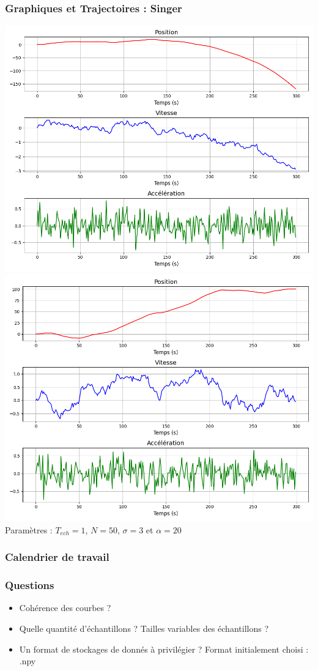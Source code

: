 \documentclass{beamer}
\begin{document}
\begin{frame}
  \frametitle{Graphiques et Trajectoires : Singer}
  \includegraphics[width=.5\textwidth]{images/SINGER_Générations_1.png}\hfill
  \includegraphics[width=.5\textwidth]{images/SINGER_Générations_2.png} 
  Paramètres : $T_{ech} = 1$, $N = 50$, $\sigma = 3$ et $\alpha = 20$
\end{frame}

\begin{frame}
  \frametitle{Calendrier de travail}

\end{frame}

\begin{frame}
  \frametitle{Questions}
  \begin{itemize}
    \item Cohérence des courbes ?
    \item Quelle quantité d'échantillons ? Tailles variables des échantillons ?
    \item Un format de stockages de donnés à privilégier ? Format initialement choisi : .npy
  \end{itemize}
\end{frame}

\end{document}
